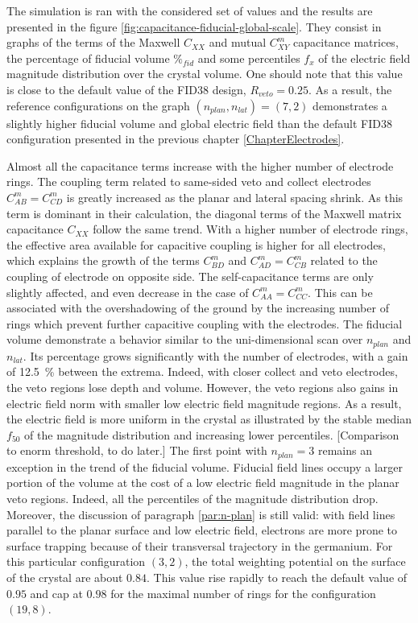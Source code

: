 The simulation is ran with the considered set of values and the results are presented in the figure \ref{fig:capacitance-fiducial-global-scale}.  They consist in graphs of the terms of the Maxwell $C_{XX}$ and mutual $C_{XY}^m$ capacitance matrices, the percentage of fiducial volume $\%_{fid}$ and some percentiles $f_x$ of the electric field magnitude distribution over the crystal volume.
One should note that this value is close to the default value of the FID38 design, $R_{veto}=0.25$. As a result, the reference configurations on the graph $\left( n_{plan}, n_{lat} \right) = (7,2)$ demonstrates a slightly higher fiducial volume and global electric field than the default FID38 configuration presented in the previous chapter \ref{ChapterElectrodes}.

Almost all the capacitance terms increase with the higher number of electrode rings. The coupling term related to same-sided veto and collect electrodes $C_{AB}^m=C_{CD}^m$ is greatly increased as the planar and lateral spacing shrink. As this term is dominant in their calculation, the diagonal terms of the Maxwell matrix capacitance $C_{XX}$ follow the same trend. With a higher number of electrode rings, the effective area available for capacitive coupling is higher for all electrodes, which explains the growth of the terms $C_{BD}^m$ and $C_{AD}^m=C_{CB}^m$ related to the coupling of electrode on opposite side. The self-capacitance terms are only slightly affected, and even decrease in the case of $C_{AA}^m=C_{CC}^m$. This can be associated with the overshadowing of the ground by the increasing number of rings which prevent further capacitive coupling with the electrodes.
The fiducial volume demonstrate a behavior similar to the uni-dimensional scan over $n_{plan}$ and $n_{lat}$. Its percentage grows significantly with the number of electrodes, with a gain of \SI{12.5}{\percent} between the extrema. 
Indeed, with closer collect and veto electrodes, the veto regions lose depth and volume. However, the veto regions also gains in electric field norm with smaller low electric field magnitude regions. As a result, the electric field is more uniform in the crystal as illustrated by the stable median $f_{50}$ of the magnitude distribution and increasing lower percentiles.
{\color{red} [Comparison to enorm threshold, to do later.]}
The first point with $n_{plan} = 3$ remains an exception in the trend of the fiducial volume. Fiducial field lines occupy a larger portion of the volume at the cost of a low electric field magnitude in the planar veto regions. Indeed, all the percentiles of the magnitude distribution drop. Moreover, the discussion of paragraph \ref{par:n-plan} is still valid: with field lines parallel to the planar surface and low electric field, electrons are more prone to surface trapping because of their transversal trajectory in the germanium.
For this particular configuration $(3,2)$, the total weighting potential on the surface of the crystal are about $0.84$. This value rise rapidly to reach the default value of $0.95$ and cap at $0.98$ for the maximal number of rings for the configuration $(19,8)$.

